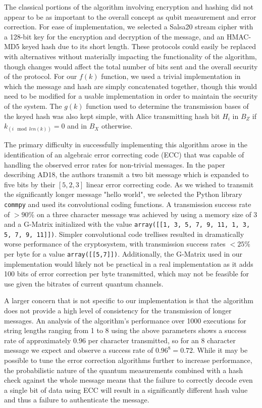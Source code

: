 \documentclass[sigconf]{acmart}
\begin{document}
The classical portions of the algorithm involving encryption and hashing did not appear to be as important to the overall concept as qubit measurement and error correction. For ease of implementation, we selected a Salsa20 stream cipher with a 128-bit key for the encryption and decryption of the message, and an HMAC-MD5 keyed hash due to its short length. These protocols could easily be replaced with alternatives without materially impacting the functionality of the algorithm, though changes would affect the total number of bits sent and the overall security of the protocol. For our $f(k)$ function, we used a trivial implementation in which the message and hash are simply concatenated together, though this would need to be modified for a usable implementation in order to maintain the security of the system. The $g(k)$ function used to determine the transmission bases of the keyed hash was also kept simple, with Alice transmitting hash bit $H_i$ in $B_Z$ if $k_{(i \mod len(k))} = 0$ and in $B_X$ otherwise.

The primary difficulty in successfully implementing this algorithm arose in the identification of an algebraic error correcting code (ECC) that was capable of handling the observed error rates for non-trivial messages. In the paper describing AD18, the authors transmit a two bit message which is expanded to five bits by their $[5,2,3]$ linear error correcting code. As we wished to transmit the significantly longer message "hello world", we selected the Python library \texttt{commpy} and used its convolutional coding functions. A transmission success rate of $>90\%$ on a three character message was achieved by using a memory size of 3 and a G-Matrix initialized with the value \texttt{array([[1, 3, 5, 7, 9, 11, 1, 3, 5, 7, 9, 11]])}. Simpler convolutional code trellises
resulted in dramatically worse performance of the cryptosystem, with transmission success rates $<25\%$ per byte for a value \texttt{array([[5,7]])}. Additionally, the G-Matrix used in our implementation would likely not be practical in a real implementation as it adds 100 bits of error correction per byte transmitted, which may not be feasible for use given the bitrates of current quantum channels.

A larger concern that is not specific to our implementation is that the algorithm does not provide a high level of consistency for the transmission of longer messages. An analysis of the algorithm's performance over 1000 executions for string lengths ranging from 1 to 8 using the above parameters shows a success rate of approximately $0.96$ per character transmitted, so for an 8 character message we expect and observe a success rate of $0.96^8 = 0.72$. While it may be possible to tune the error correction algorithms further to increase performance, the probabilistic nature of the quantum measurements combined with a hash check against the whole message means that the failure to correctly decode even a single bit of data using ECC will result in a significantly different hash value and thus a failure to authenticate the message.
\end{document}
